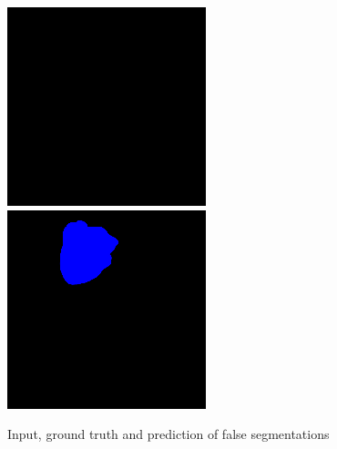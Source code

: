 \begin{figure}[H]
\endminipage\hfill
{}
  \includegraphics[width=\linewidth]{imgs/b7.png}
\endminipage\hfill
{}%
  \includegraphics[width=\linewidth]{imgs/c7.png}
\endminipage
\caption{Input, ground truth and prediction of false segmentations}
\end{figure}


